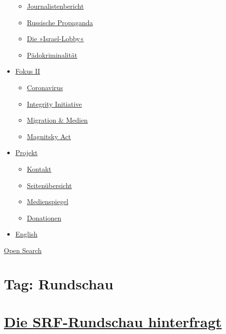 \begin{itemize}
  \begin{itemize}
  \tightlist
  \item
    \href{https://swprs.org/bericht-eines-journalisten/}{Journalistenbericht}
  \item
    \href{https://swprs.org/russische-propaganda/}{Russische Propaganda}
  \item
    \href{https://swprs.org/die-israel-lobby-fakten-und-mythen/}{Die
    »Israel-Lobby«}
  \item
    \href{https://swprs.org/geopolitik-und-paedokriminalitaet/}{Pädokriminalität}
  \end{itemize}
\item
  \href{https://swprs.org/migration-und-medien/}{Fokus II}

  \begin{itemize}
  \tightlist
  \item
    \href{https://swprs.org/covid-19-hinweis-ii/}{Coronavirus}
  \item
    \href{https://swprs.org/die-integrity-initiative/}{Integrity
    Initiative}
  \item
    \href{https://swprs.org/migration-und-medien/}{Migration \& Medien}
  \item
    \href{https://swprs.org/der-fall-magnitsky/}{Magnitsky Act}
  \end{itemize}
\item
  \href{https://swprs.org/kontakt/}{Projekt}

  \begin{itemize}
  \tightlist
  \item
    \href{https://swprs.org/kontakt/}{Kontakt}
  \item
    \href{https://swprs.org/uebersicht/}{Seitenübersicht}
  \item
    \href{https://swprs.org/medienspiegel/}{Medienspiegel}
  \item
    \href{https://swprs.org/donationen/}{Donationen}
  \end{itemize}
\item
  \href{https://swprs.org/contact/}{English}
\end{itemize}

\protect\hyperlink{}{Open Search}

\hypertarget{tag-rundschau}{%
\section{Tag: Rundschau}\label{tag-rundschau}}

\hypertarget{die-srf-rundschau-hinterfragt}{%
\section{\texorpdfstring{\href{https://swprs.org/2017/03/01/srf-rundschau/}{Die
SRF-Rundschau
hinterfragt}}{Die SRF-Rundschau hinterfragt}}\label{die-srf-rundschau-hinterfragt}}

